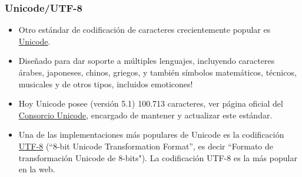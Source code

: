 \documentclass[aspectratio=169]{beamer}
\begin{document}
\begin{frame}[fragile]\frametitle{Unicode/UTF-8}
\begin{itemize}
\item Otro estándar de codificación de caracteres crecientemente popular es \href{https://es.wikipedia.org/wiki/Unicode}{Unicode}. 
\item Dise\~nado para dar soporte a múltiples lenguajes, incluyendo caracteres árabes, japoneses, chinos, griegos, y también símbolos matemáticos, técnicos, musicales y de otros tipos, incluidos emoticones! 
\item Hoy Unicode posee (versión 5.1) 100.713 caracteres, ver página oficial del \href{http://www.unicode.org/charts/}{Consorcio Unicode}, encargado de mantener y actualizar este estándar. 
\item Una de las implementaciones más populares de Unicode es la codificación \href{https://es.wikipedia.org/wiki/UTF-8}{UTF-8} (``8-bit Unicode Transformation Format'', es decir ``Formato de transformación Unicode de 8-bits"). La codificación UTF-8 es la más popular en la web.
\end{itemize}
\end{frame}



\end{document}
